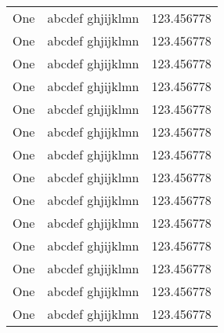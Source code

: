 \documentclass{article}
\begin{document}
\begin{center}
\begin{longtable}{|l|l|l|}
		One                                                  & abcdef ghjijklmn                            & 123.456778                                 \\
		One                                                  & abcdef ghjijklmn                            & 123.456778                                 \\
		One                                                  & abcdef ghjijklmn                            & 123.456778                                 \\
		One                                                  & abcdef ghjijklmn                            & 123.456778                                 \\
		One                                                  & abcdef ghjijklmn                            & 123.456778                                 \\
		One                                                  & abcdef ghjijklmn                            & 123.456778                                 \\
		One                                                  & abcdef ghjijklmn                            & 123.456778                                 \\
		One                                                  & abcdef ghjijklmn                            & 123.456778                                 \\
		One                                                  & abcdef ghjijklmn                            & 123.456778                                 \\
		One                                                  & abcdef ghjijklmn                            & 123.456778                                 \\
		One                                                  & abcdef ghjijklmn                            & 123.456778                                 \\
		One                                                  & abcdef ghjijklmn                            & 123.456778                                 \\
		One                                                  & abcdef ghjijklmn                            & 123.456778                                 \\
		One                                                  & abcdef ghjijklmn                            & 123.456778                                 \\

\end{longtable}
\end{center}
\end{document}
